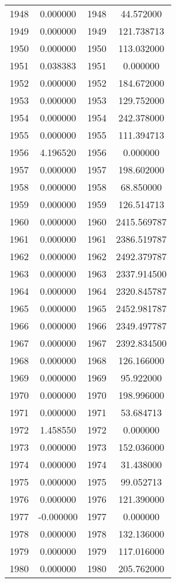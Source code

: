 \documentclass[12pt]{article}
\begin{document}
\begin{longtable}{@{}cccc@{}}
1948 & 0.000000 & 1948 & 44.572000 \\
1949 & 0.000000 & 1949 & 121.738713 \\
1950 & 0.000000 & 1950 & 113.032000 \\
1951 & 0.038383 & 1951 & 0.000000 \\
1952 & 0.000000 & 1952 & 184.672000 \\
1953 & 0.000000 & 1953 & 129.752000 \\
1954 & 0.000000 & 1954 & 242.378000 \\
1955 & 0.000000 & 1955 & 111.394713 \\
1956 & 4.196520 & 1956 & 0.000000 \\
1957 & 0.000000 & 1957 & 198.602000 \\
1958 & 0.000000 & 1958 & 68.850000 \\
1959 & 0.000000 & 1959 & 126.514713 \\
1960 & 0.000000 & 1960 & 2415.569787 \\
1961 & 0.000000 & 1961 & 2386.519787 \\
1962 & 0.000000 & 1962 & 2492.379787 \\
1963 & 0.000000 & 1963 & 2337.914500 \\
1964 & 0.000000 & 1964 & 2320.845787 \\
1965 & 0.000000 & 1965 & 2452.981787 \\
1966 & 0.000000 & 1966 & 2349.497787 \\
1967 & 0.000000 & 1967 & 2392.834500 \\
1968 & 0.000000 & 1968 & 126.166000 \\
1969 & 0.000000 & 1969 & 95.922000 \\
1970 & 0.000000 & 1970 & 198.996000 \\
1971 & 0.000000 & 1971 & 53.684713 \\
1972 & 1.458550 & 1972 & 0.000000 \\
1973 & 0.000000 & 1973 & 152.036000 \\
1974 & 0.000000 & 1974 & 31.438000 \\
1975 & 0.000000 & 1975 & 99.052713 \\
1976 & 0.000000 & 1976 & 121.390000 \\
1977 & -0.000000 & 1977 & 0.000000 \\
1978 & 0.000000 & 1978 & 132.136000 \\
1979 & 0.000000 & 1979 & 117.016000 \\
1980 & 0.000000 & 1980 & 205.762000 \\

\end{longtable}
\end{document}
